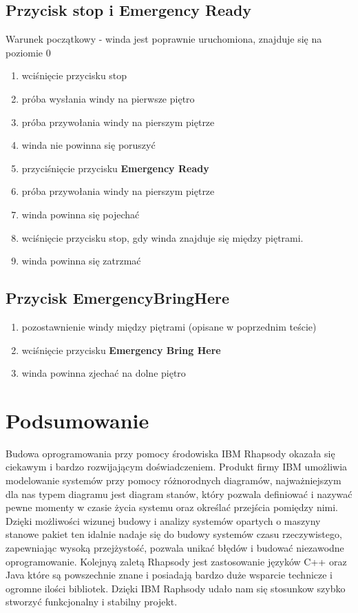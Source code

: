 \documentclass[a4paper,11pt]{article}
\begin{document}
	\subsection{Przycisk stop i Emergency Ready}
		Warunek początkowy - winda jest poprawnie uruchomiona, znajduje się na poziomie 0
		\begin{enumerate}
			\item wciśnięcie przycisku stop
			\item próba wysłania windy na pierwsze piętro
			\item próba przywołania windy na pierszym piętrze 
			\item winda nie powinna się poruszyć
			\item przyciśnięcie przycisku \textbf{Emergency Ready}
			\item próba przywołania windy na pierszym piętrze 
			\item winda powinna się pojechać
			\item wciśnięcie przycisku stop, gdy winda znajduje się między piętrami.
			\item winda powinna się zatrzmać
		\end{enumerate} 
		
	\subsection{Przycisk EmergencyBringHere}
		\begin{enumerate}
			\item pozostawnienie windy między piętrami (opisane w poprzednim teście)
			\item wciśnięcie przycisku \textbf{Emergency Bring Here}
			\item winda powinna zjechać na dolne piętro
		\end{enumerate}
		
	
\section{Podsumowanie}
	Budowa oprogramowania przy pomocy środowiska IBM Rhapsody 
	okazała się ciekawym i bardzo rozwijającym doświadczeniem.
	Produkt firmy IBM umożliwia modelowanie systemów przy pomocy różnorodnych diagramów, najważniejszym dla nas
	typem diagramu jest diagram stanów, który pozwala definiować i nazywać pewne momenty w czasie życia systemu oraz określać przejścia pomiędzy nimi.
	Dzięki możliwości wizunej budowy i analizy systemów opartych o maszyny stanowe pakiet ten idalnie 
	nadaje się do budowy systemów czasu rzeczywistego, zapewniając wysoką przejżystość, pozwala unikać błędów i budować niezawodne oprogramowanie.
	Kolejnyą zaletą Rhapsody jest zastosowanie 
	języków C++ oraz Java które są powszechnie znane i posiadają bardzo 
	duże wsparcie technicze i ogromne ilości bibliotek.
	Dzięki IBM Raphsody udało nam się stosunkow szybko stworzyć funkcjonalny i stabilny projekt.
\end{document}
